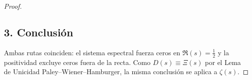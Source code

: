 \begin{proof}
\subsection*{3. Conclusión}
Ambas rutas coinciden: el sistema espectral fuerza ceros en $\Re(s)=\tfrac{1}{2}$ 
y la positividad excluye ceros fuera de la recta. 
Como $D(s)\equiv\Xi(s)$ por el Lema de Unicidad Paley--Wiener--Hamburger, 
la misma conclusión se aplica a $\zeta(s)$. 
\end{proof}